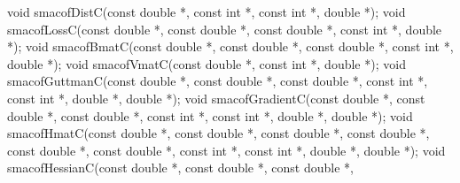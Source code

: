 \documentclass[12pt,]{article}
\newenvironment{Shaded}{\begin{snugshade}}{\end{snugshade}}
\newcommand{\DataTypeTok}[1]{\textcolor[rgb]{0.13,0.29,0.53}{#1}}
\newcommand{\NormalTok}[1]{#1}
\begin{document}
\begin{Shaded}
\begin{Highlighting}[]
\DataTypeTok{void}\NormalTok{ smacofDistC(}\DataTypeTok{const} \DataTypeTok{double}\NormalTok{ *, }\DataTypeTok{const} \DataTypeTok{int}\NormalTok{ *, }\DataTypeTok{const} \DataTypeTok{int}\NormalTok{ *, }\DataTypeTok{double}\NormalTok{ *);}
\DataTypeTok{void}\NormalTok{ smacofLossC(}\DataTypeTok{const} \DataTypeTok{double}\NormalTok{ *, }\DataTypeTok{const} \DataTypeTok{double}\NormalTok{ *, }\DataTypeTok{const} \DataTypeTok{double}\NormalTok{ *, }\DataTypeTok{const} \DataTypeTok{int}\NormalTok{ *,}
                 \DataTypeTok{double}\NormalTok{ *);}
\DataTypeTok{void}\NormalTok{ smacofBmatC(}\DataTypeTok{const} \DataTypeTok{double}\NormalTok{ *, }\DataTypeTok{const} \DataTypeTok{double}\NormalTok{ *, }\DataTypeTok{const} \DataTypeTok{double}\NormalTok{ *, }\DataTypeTok{const} \DataTypeTok{int}\NormalTok{ *,}
                 \DataTypeTok{double}\NormalTok{ *);}
\DataTypeTok{void}\NormalTok{ smacofVmatC(}\DataTypeTok{const} \DataTypeTok{double}\NormalTok{ *, }\DataTypeTok{const} \DataTypeTok{int}\NormalTok{ *, }\DataTypeTok{double}\NormalTok{ *);}
\DataTypeTok{void}\NormalTok{ smacofGuttmanC(}\DataTypeTok{const} \DataTypeTok{double}\NormalTok{ *, }\DataTypeTok{const} \DataTypeTok{double}\NormalTok{ *, }\DataTypeTok{const} \DataTypeTok{double}\NormalTok{ *, }\DataTypeTok{const} \DataTypeTok{int}\NormalTok{ *,}
                    \DataTypeTok{const} \DataTypeTok{int}\NormalTok{ *, }\DataTypeTok{double}\NormalTok{ *, }\DataTypeTok{double}\NormalTok{ *);}
\DataTypeTok{void}\NormalTok{ smacofGradientC(}\DataTypeTok{const} \DataTypeTok{double}\NormalTok{ *, }\DataTypeTok{const} \DataTypeTok{double}\NormalTok{ *, }\DataTypeTok{const} \DataTypeTok{double}\NormalTok{ *,}
                     \DataTypeTok{const} \DataTypeTok{int}\NormalTok{ *, }\DataTypeTok{const} \DataTypeTok{int}\NormalTok{ *, }\DataTypeTok{double}\NormalTok{ *, }\DataTypeTok{double}\NormalTok{ *);}
\DataTypeTok{void}\NormalTok{ smacofHmatC(}\DataTypeTok{const} \DataTypeTok{double}\NormalTok{ *, }\DataTypeTok{const} \DataTypeTok{double}\NormalTok{ *, }\DataTypeTok{const} \DataTypeTok{double}\NormalTok{ *, }\DataTypeTok{const} \DataTypeTok{double}\NormalTok{ *,}
                 \DataTypeTok{const} \DataTypeTok{double}\NormalTok{ *, }\DataTypeTok{const} \DataTypeTok{double}\NormalTok{ *, }\DataTypeTok{const} \DataTypeTok{int}\NormalTok{ *, }\DataTypeTok{const} \DataTypeTok{int}\NormalTok{ *,}
                 \DataTypeTok{double}\NormalTok{ *, }\DataTypeTok{double}\NormalTok{ *);}
\DataTypeTok{void}\NormalTok{ smacofHessianC(}\DataTypeTok{const} \DataTypeTok{double}\NormalTok{ *, }\DataTypeTok{const} \DataTypeTok{double}\NormalTok{ *, }\DataTypeTok{const} \DataTypeTok{double}\NormalTok{ *,}

\end{Highlighting}
\end{Shaded}
\end{document}
